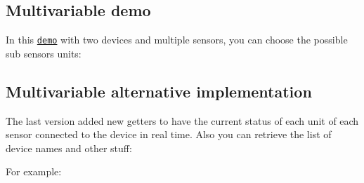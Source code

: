 \subsection*{Multivariable demo}

In this \href{https://www.youtube.com/watch?v=-5Va47Bap48}{\tt demo} with two devices and multiple sensors, you can choose the possible sub sensors units\+:

\href{https://www.youtube.com/watch?v=-5Va47Bap48}{\tt }

\subsection*{Multivariable alternative implementation}

The last version added new getters to have the current status of each unit of each sensor connected to the device in real time. Also you can retrieve the list of device names and other stuff\+:

For example\+:


